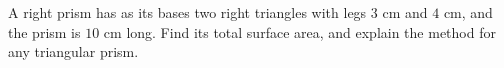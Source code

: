 A right prism has as its bases two right triangles with legs $3$ cm and $4$ cm, and the prism is $10$ cm long. Find its total surface area, and explain the method for any triangular prism.
